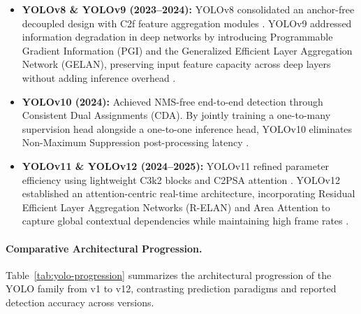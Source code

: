 \begin{itemize}
    \item \textbf{YOLOv8 \& YOLOv9 (2023--2024):} YOLOv8 consolidated an anchor-free decoupled design with C2f feature aggregation modules \parencite{ramos_yoloreview}. YOLOv9 addressed information degradation in deep networks by introducing Programmable Gradient Information (PGI) and the Generalized Efficient Layer Aggregation Network (GELAN), preserving input feature capacity across deep layers without adding inference overhead \parencite{wang_yolov9_2024, ramos_yoloreview}.

    \item \textbf{YOLOv10 (2024):} Achieved NMS-free end-to-end detection through Consistent Dual Assignments (CDA). By jointly training a one-to-many supervision head alongside a one-to-one inference head, YOLOv10 eliminates Non-Maximum Suppression post-processing latency \parencite{wang_yolov10_2024, ramos_yoloreview}.

    \item \textbf{YOLOv11 \& YOLOv12 (2024--2025):} YOLOv11 refined parameter efficiency using lightweight C3k2 blocks and C2PSA attention \parencite{ramos_yoloreview}. YOLOv12 established an attention-centric real-time architecture, incorporating Residual Efficient Layer Aggregation Networks (R-ELAN) and Area Attention to capture global contextual dependencies while maintaining high frame rates \parencite{tian_yolov12_2025, ramos_yoloreview}.
\end{itemize}

\paragraph{Comparative Architectural Progression.}
Table~\ref{tab:yolo-progression} summarizes the architectural progression of the YOLO family from v1 to v12, contrasting prediction paradigms and reported detection accuracy across versions.

